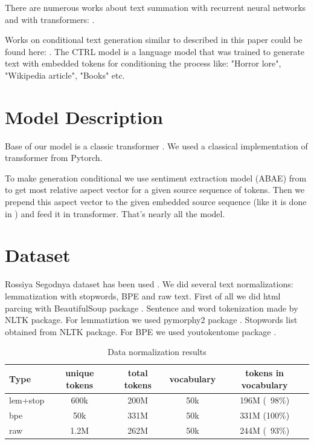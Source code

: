 \documentclass{article}
\begin{document}
There are numerous works about text summation with recurrent neural networks \cite{nallapati2016abstractive, li2017deep} and with transformers: \cite{zhang2019hibert, hoang2019efficient}. 

Works on conditional text generation similar to described in this paper could be found here: \cite{keskar2019ctrl, xia2020cg}. The CTRL model is a language model that was trained to generate text with embedded tokens for conditioning the process like: "Horror lore", "Wikipedia article", "Books" etc.

\section{Model Description}
Base of our model is a classic transformer \cite{vaswani2017attention}. We used a classical implementation of transformer from Pytorch. 

To make generation conditional we use sentiment extraction model (ABAE) from \cite{he2017unsupervised} to get most relative aspect vector for a given source sequence of tokens. Then we prepend this aspect vector to the given embedded source sequence (like it is done in \cite{keskar2019ctrl}) and feed it in transformer. That's nearly all the model. 

\section{Dataset}
Rossiya Segodnya dataset has been used \cite{RiaRepoUrl}.
We did several text normalizations: lemmatization with stopwords, BPE and raw text.
First of all we did html parcing with BeautifulSoup package \cite{richardson2007beautiful}. Sentence and word tokenization made by NLTK \cite{Loper02nltk:the} package. For lemmatiztion we used pymorphy2 package \cite{pymorphy2}. Stopwords list obtained from NLTK package. For BPE we used youtokentome package \cite{youtokentome}. 

\begin{table}[H]
\begin{center}
\begin{tabular}[t]{|l|cccc|}
\hline
Type &  unique tokens & total tokens & vocabulary & tokens in vocabulary \\
\hline
lem+stop & 600k & 200M & 50k & 196M (~98\%) \\
bpe & 50k & 331M & 50k & 331M (100\%) \\
raw & 1.2M & 262M & 50k & 244M (~93\%)  \\
\hline
\end{tabular}
\caption{Data normalization results}
\label{tab:data_norm}
\end{center}
\end{table}
\end{document}
